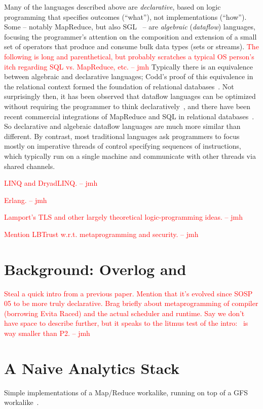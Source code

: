 \documentclass{sig-alternate}
\newcommand{\jmh}[1]{{\textcolor{red}{#1 -- jmh}}}
\begin{document}
Many of the languages described above are {\em declarative}, based on logic programming that specifies outcomes (``what''), not implementations (``how'').  Some -- notably MapReduce, but also SGL~\cite{cornellgames} -- are {\em algebraic} ({\em dataflow}) languages, focusing the programmer's attention on the composition and extension of a small set of operators that produce and consume bulk data types (sets or streams).  \jmh{The following is long and parenthetical, but probably scratches a typical OS person's itch regarding SQL vs. MapReduce, etc.}  Typically there is an equivalence between algebraic and declarative languages; Codd's proof of this equivalence in the relational context formed the foundation of relational databases~\cite{Codd70}. Not surprisingly then, it has been observed that dataflow languages can be optimized without requiring the programmer to think declaratively~\cite{volcano,cornellgames}, and there have been recent commercial integrations of MapReduce and SQL in relational databases~\cite{greenplum,aster}.  So declarative and algebraic dataflow languages are much more similar than different. By contrast, most traditional languages ask programmers to focus mostly on imperative threads of control specifying sequences of instructions, which typically run on a single machine and communicate with other threads via shared channels.

\jmh{LINQ and DryadLINQ.}

\jmh{Erlang.}

\jmh{Lamport's TLS and other largely theoretical logic-programming ideas.}

\jmh{Mention LBTrust w.r.t. metaprogramming and security.}

\section{Background: Overlog and \JOL}
\jmh{Steal a quick intro from a previous paper.  Mention that it's evolved since SOSP 05 to be more truly declarative.  Brag briefly about metaprogramming of compiler (borrowing Evita Raced) and the actual scheduler and runtime.  Say we don't have space to describe further, but it speaks to the litmus test of the intro: \JOL\ is way smaller than P2.}
\section{A Naive Analytics Stack}
Simple implementations of a Map/Reduce workalike, running on top of a
GFS workalike~\cite{gfs-sosp}.
\end{document}
